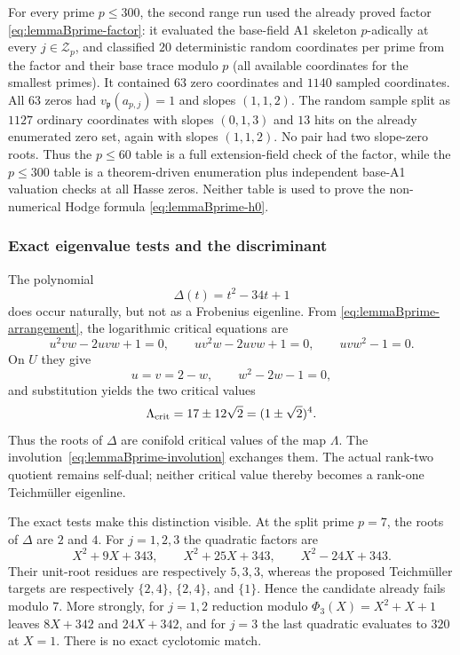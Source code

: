 For every prime $p\leq300$, the second range run used the already proved factor
\eqref{eq:lemmaBprime-factor}: it evaluated the base-field A1 skeleton
$p$-adically at every $j\in\mathcal Z_p$, and classified $20$ deterministic
random coordinates per prime from the factor and their base trace modulo $p$
(all available coordinates for the smallest primes).
It contained $63$ zero coordinates and $1140$ sampled coordinates.  All $63$ zeros had
$v_{\mathfrak p}(a_{p,j})=1$ and slopes $(1,1,2)$.  The random sample split
as $1127$ ordinary coordinates with slopes $(0,1,3)$ and $13$ hits on the
already enumerated zero set, again with slopes $(1,1,2)$.  No pair had two
slope-zero roots.  Thus the $p\leq60$ table is a full extension-field check
of the factor, while the $p\leq300$ table is a theorem-driven enumeration
plus independent base-A1 valuation checks at all Hasse zeros.  Neither table
is used to prove the non-numerical Hodge formula
\eqref{eq:lemmaBprime-h0}.

\subsubsection{Exact eigenvalue tests and the discriminant}

The polynomial
\[
 \Delta(t)=t^2-34t+1
\]
does occur naturally, but not as a Frobenius eigenline.  From
\eqref{eq:lemmaBprime-arrangement}, the logarithmic critical equations are
\[
 u^2vw-2uvw+1=0,\qquad
 uv^2w-2uvw+1=0,\qquad
 uvw^2-1=0.
\]
On $U$ they give
\[
 u=v=2-w,\qquad w^2-2w-1=0,
\]
and substitution yields the two critical values
\begin{equation}
 \Lambda_{\rm crit}=17\pm12\sqrt2=(1\pm\sqrt2)^4.
 \label{eq:lemmaBprime-critical-values}
\end{equation}
Thus the roots of $\Delta$ are conifold critical values of the map
$\Lambda$.  The involution~\eqref{eq:lemmaBprime-involution} exchanges
them.  The actual rank-two quotient remains self-dual; neither critical
value thereby becomes a rank-one Teichm\"uller eigenline.

The exact tests make this distinction visible.
At the split prime $p=7$, the roots of $\Delta$ are $2$ and $4$.  For
$j=1,2,3$ the quadratic factors are
\[
 X^2+9X+343,\qquad X^2+25X+343,\qquad X^2-24X+343.
\]
Their unit-root residues are respectively $5,3,3$, whereas the proposed
Teichm\"uller targets are respectively $\{2,4\}$, $\{2,4\}$, and
$\{1\}$.  Hence the candidate already fails modulo $7$.  More strongly,
for $j=1,2$ reduction modulo $\Phi_3(X)=X^2+X+1$ leaves
$8X+342$ and $24X+342$, and for $j=3$ the last quadratic evaluates to
$320$ at $X=1$.  There is no exact cyclotomic match.

